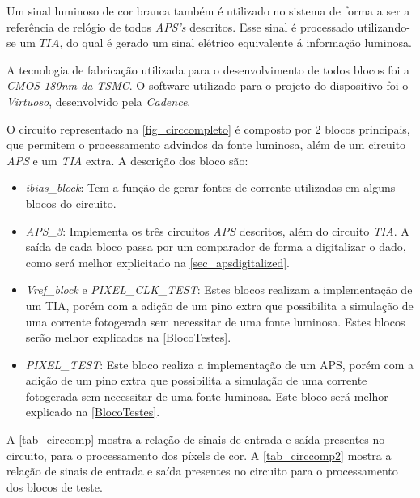Um sinal luminoso de cor branca tamb\'em \'e utilizado no sistema de forma a ser a refer\^encia de rel\'ogio de todos \emph{APS's} descritos. Esse sinal \'e processado utilizando-se um $TIA$, do qual \'e gerado um sinal el\'etrico equivalente \'a informa{\c c}\~ao luminosa.

A tecnologia de fabrica{\c c}\~ao utilizada para o desenvolvimento de todos blocos foi a \emph{CMOS 180nm da TSMC}. O software utilizado para o projeto do dispositivo foi o \emph{Virtuoso}, desenvolvido pela \emph{Cadence}.

O circuito representado na \autoref{fig_circcompleto} \'e composto por 2 blocos principais, que permitem o processamento advindos da fonte luminosa, al\'em de um circuito \emph{APS} e um \emph{TIA} extra. A descri{\c c}\~ao dos bloco s\~ao:

\begin{itemize}
    \item \emph{ibias\_block}: Tem a fun{\c c}\~ao de gerar fontes de corrente utilizadas em alguns blocos do circuito.
    
    \item \emph{APS\_3}: Implementa os tr\^es circuitos \emph{APS} descritos, al\'em do circuito \emph{TIA}. A sa\'ida de cada bloco passa por um comparador de forma a digitalizar o dado, como ser\'a melhor explicitado na \autoref{sec_apsdigitalized}.
    
    \item \emph{Vref\_block} e \emph{PIXEL\_CLK\_TEST}: Estes blocos realizam a implementa{\c c}\~ao de um TIA, por\'em com a adi{\c c}\~ao de um pino extra que possibilita a simula{\c c}\~ao de uma corrente fotogerada sem necessitar de uma fonte luminosa. Estes blocos ser\~ao melhor explicados na \autoref{BlocoTestes}. 
    
    \item \emph{PIXEL\_TEST}: Este bloco realiza a implementa{\c c}\~ao de um APS, por\'em com a adi{\c c}\~ao de um pino extra que possibilita a simula{\c c}\~ao de uma corrente fotogerada sem necessitar de uma fonte luminosa. Este bloco será melhor explicado na \autoref{BlocoTestes}.
    
\end{itemize}

A \autoref{tab_circcomp} mostra a rela{\c c}\~ao de sinais de entrada e sa\'ida presentes no circuito, para o processamento dos p\'ixels de cor. A \autoref{tab_circcomp2} mostra a rela{\c c}\~ao de sinais de entrada e sa\'ida presentes no circuito para o processamento dos blocos de teste.

